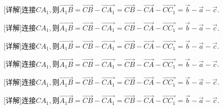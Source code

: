 \documentclass[fontset=none]{ctexart}
\begin{document}
\noindent\begin{minipage}[t]{46.368mm}\raggedright [详解]连接\(CA_{1},\)则\nobreak\(\overrightarrow{A_{1}B} = \overrightarrow{CB} - \overrightarrow{CA_{1}} = \overrightarrow{CB} - \overrightarrow{CA} - \overrightarrow{CC_{1}} =\overrightarrow{b} - \overrightarrow{a} - \overrightarrow{c}\).\end{minipage}\par\newpage
\noindent\begin{minipage}[t]{47.500mm}\raggedright [详解]连接\(CA_{1},\)则\nobreak\(\overrightarrow{A_{1}B} = \overrightarrow{CB} - \overrightarrow{CA_{1}} = \overrightarrow{CB} - \overrightarrow{CA} - \overrightarrow{CC_{1}} =\overrightarrow{b} - \overrightarrow{a} - \overrightarrow{c}\).\end{minipage}\par\newpage
\noindent\begin{minipage}[t]{48.500mm}\raggedright [详解]连接\(CA_{1},\)则\nobreak\(\overrightarrow{A_{1}B} = \overrightarrow{CB} - \overrightarrow{CA_{1}} = \overrightarrow{CB} - \overrightarrow{CA} - \overrightarrow{CC_{1}} =\overrightarrow{b} - \overrightarrow{a} - \overrightarrow{c}\).\end{minipage}\par\newpage
\noindent\begin{minipage}[t]{49.500mm}\raggedright [详解]连接\(CA_{1},\)则\nobreak\(\overrightarrow{A_{1}B} = \overrightarrow{CB} - \overrightarrow{CA_{1}} = \overrightarrow{CB} - \overrightarrow{CA} - \overrightarrow{CC_{1}} =\overrightarrow{b} - \overrightarrow{a} - \overrightarrow{c}\).\end{minipage}\par\newpage
\noindent\begin{minipage}[t]{50.500mm}\raggedright [详解]连接\(CA_{1},\)则\nobreak\(\overrightarrow{A_{1}B} = \overrightarrow{CB} - \overrightarrow{CA_{1}} = \overrightarrow{CB} - \overrightarrow{CA} - \overrightarrow{CC_{1}} =\overrightarrow{b} - \overrightarrow{a} - \overrightarrow{c}\).\end{minipage}\par\newpage
\noindent\begin{minipage}[t]{52.000mm}\raggedright [详解]连接\(CA_{1},\)则\nobreak\(\overrightarrow{A_{1}B} = \overrightarrow{CB} - \overrightarrow{CA_{1}} = \overrightarrow{CB} - \overrightarrow{CA} - \overrightarrow{CC_{1}} =\overrightarrow{b} - \overrightarrow{a} - \overrightarrow{c}\).\end{minipage}\par\newpage
\end{document}
